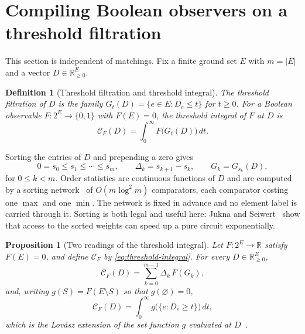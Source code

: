 \documentclass[11pt]{article}
\newtheorem{proposition}[theorem]{Proposition}
\newtheorem{definition}[theorem]{Definition}
\begin{document}
\section{Compiling Boolean observers on a threshold filtration}
\label{sec:amplitude}

This section is independent of matchings.  Fix a finite ground set $E$ with
$m=|E|$ and a vector $D\in\mathbb R_{\ge0}^{E}$.

\begin{definition}[Threshold filtration and threshold integral]
\label{def:filtration}
The \emph{threshold filtration} of $D$ is the family
$G_t(D)=\{e\in E: D_e\le t\}$ for $t\ge0$.  For a Boolean observable
$F\colon2^{E}\to\{0,1\}$ with $F(E)=0$, the \emph{threshold integral} of $F$ at
$D$ is
\begin{equation}
  \mathcal C_F(D)=\int_0^{\infty}F\bigl(G_t(D)\bigr)\,dt .
  \label{eq:threshold-integral}
\end{equation}
\end{definition}

Sorting the entries of $D$ and prepending a zero gives
\begin{equation}
  0=s_0\le s_1\le\cdots\le s_m,
  \qquad
  \Delta_k=s_{k+1}-s_k,
  \qquad
  G_k=G_{s_k}(D),
  \label{eq:sorted}
\end{equation}
for $0\le k<m$.  Order statistics are continuous functions of $D$ and are
computed by a sorting network~\cite{batcher68} of $O(m\log^{2}m)$ comparators,
each comparator costing one $\max$ and one $\min$.  The network is fixed in
advance and no element label is carried through it.  Sorting is both legal and
useful here: Jukna and Seiwert~\cite{jukna-seiwert-sorting20} show that access
to the sorted weights can speed up a pure circuit exponentially.

\begin{proposition}[Two readings of the threshold integral]
\label{prop:two-readings}
Let $F\colon2^{E}\to\mathbb R$ satisfy $F(E)=0$, and define $\mathcal C_F$ by
\eqref{eq:threshold-integral}.  For every $D\in\mathbb R_{\ge0}^{E}$,
\begin{equation}
  \mathcal C_F(D)=\sum_{k=0}^{m-1}\Delta_k\,F(G_k),
  \label{eq:gap-sum}
\end{equation}
and, writing $g(S)=F(E\setminus S)$ so that $g(\varnothing)=0$,
\begin{equation}
  \mathcal C_F(D)=\int_0^{\infty}g\bigl(\{e:D_e\ge t\}\bigr)\,dt ,
  \label{eq:lovasz}
\end{equation}
which is the Lov\'asz extension of the set function $g$ evaluated at
$D$~\cite{lovasz83}.
\end{proposition}
\end{document}
